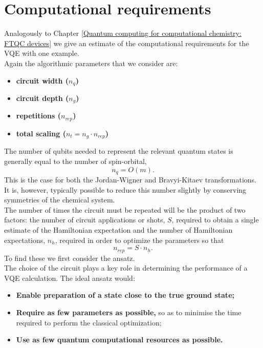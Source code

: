 \section{Computational requirements}
Analogously to Chapter \ref{Quantum computing for computational chemistry: FTQC devices} we give an estimate of the computational requirements for the VQE with one example. \\
Again the algorithmic parameters that we consider are:
\begin{itemize}
    \item \textbf{circuit width ($n_q$)}
    
    \item \textbf{circuit depth ($n_g$)}
    
    \item \textbf{repetitions ($n_{rep}$)}
    
    \item \textbf{total scaling ($n_t = n_g \cdot n_{rep}$)}
\end{itemize}
The number of qubits needed to represent the relevant quantum states is generally equal to the number of spin-orbital,
\begin{equation}
    n_q = O(m).
\end{equation}
This is the case for both the Jordan-Wigner and Bravyi-Kitaev transformations. It is, however, typically possible to reduce this number slightly by conserving symmetries of the chemical system. \\
The number of times the circuit must be repeated will be the product of two factors: the number of circuit applications or shots, $S$, required to obtain a single estimate of the Hamiltonian expectation and the number of Hamiltonian expectations, $n_h$, required in order to optimize the parameters so that 
\begin{equation}
    n_{rep} = S \cdot n_h.
\end{equation}
To find these we first consider the ansatz. \\
The choice of the circuit plays a key role in determining the performance of a VQE calculation. The ideal ansatz would:
\begin{itemize}
    \item \textbf{Enable preparation of a state close to the true ground state;}
    
    \item \textbf{Require as few parameters as possible,} so as to minimise the time required to perform the classical optimization;
    
    \item \textbf{Use as few quantum computational resources as possible.}
\end{itemize}
